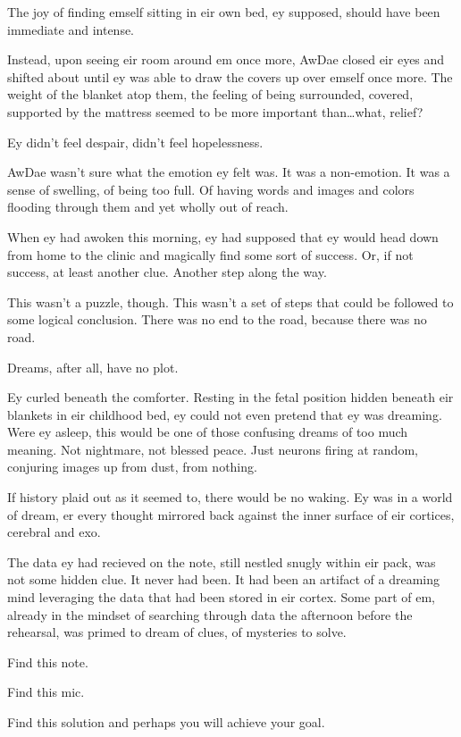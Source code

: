 The joy of finding emself sitting in eir own bed, ey supposed, should have been immediate and intense.

Instead, upon seeing eir room around em once more, AwDae closed eir eyes and shifted about until ey was able to draw the covers up over emself once more. The weight of the blanket atop them, the feeling of being surrounded, covered, supported by the mattress seemed to be more important than\ldots{}what, relief?

Ey didn't feel despair, didn't feel hopelessness.

AwDae wasn't sure what the emotion ey felt was. It was a non-emotion. It was a sense of swelling, of being too full. Of having words and images and colors flooding through them and yet wholly out of reach.

When ey had awoken this morning, ey had supposed that ey would head down from home to the clinic and magically find some sort of success. Or, if not success, at least another clue. Another step along the way.

This wasn't a puzzle, though. This wasn't a set of steps that could be followed to some logical conclusion. There was no end to the road, because there was no road.

Dreams, after all, have no plot.

Ey curled beneath the comforter. Resting in the fetal position hidden beneath eir blankets in eir childhood bed, ey could not even pretend that ey was dreaming. Were ey asleep, this would be one of those confusing dreams of too much meaning. Not nightmare, not blessed peace. Just neurons firing at random, conjuring images up from dust, from nothing.

If history plaid out as it seemed to, there would be no waking. Ey was in a world of dream, er every thought mirrored back against the inner surface of eir cortices, cerebral and exo.

The data ey had recieved on the note, still nestled snugly within eir pack, was not some hidden clue. It never had been. It had been an artifact of a dreaming mind leveraging the data that had been stored in eir cortex. Some part of em, already in the mindset of searching through data the afternoon before the rehearsal, was primed to dream of clues, of mysteries to solve.

Find this note.

Find this mic.

Find this solution and perhaps you will achieve your goal.

